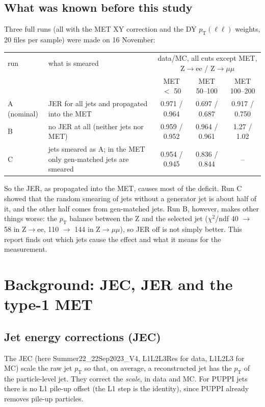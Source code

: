 \documentclass[11pt,a4paper]{article}
\newcommand{\Zee}{Z$\to$ee}
\newcommand{\Zmm}{Z$\to\mu\mu$}
\newcommand{\pt}{$p_\mathrm{T}$}
\begin{document}
\subsection{What was known before this study}
Three full runs (all with the MET XY correction and the DY $p_\mathrm{T}(\ell\ell)$ weights, 20 files per sample) were made on 16 November:
\begin{center}
\footnotesize
\begin{tabular}{l p{5.4cm} ccc}
\toprule
run & what is smeared & \multicolumn{3}{c}{data/MC, all cuts except MET, \Zee{} / \Zmm} \\
 & & MET $<$ 50 & MET 50--100 & MET 100--200 \\
\midrule
A (nominal) & JER for all jets and propagated into the MET & 0.971 / 0.964 & 0.697 / 0.687 & 0.917 / 0.750 \\
B & no JER at all (neither jets nor MET) & 0.959 / 0.952 & 0.964 / 0.961 & 1.27 / 1.02 \\
C & jets smeared as A; in the MET only gen-matched jets are smeared & 0.954 / 0.945 & 0.836 / 0.844 & -- \\
\bottomrule
\end{tabular}
\end{center}
So the JER, as propagated into the MET, causes most of the deficit. Run C showed that the random smearing of jets without a
generator jet is about half of it, and the other half comes from gen-matched jets. Run B, however, makes other things worse:
the \pt{} balance between the Z and the selected jet ($\chi^2$/ndf 40 $\to$ 58 in \Zee, 110 $\to$ 144 in \Zmm), so JER off is
not simply better. This report finds out which jets cause the effect and what it means for the measurement.

\section{Background: JEC, JER and the type-1 MET}
\label{sec:bg}

\subsection{Jet energy corrections (JEC)}
The JEC (here Summer22\_22Sep2023\_V4, L1L2L3Res for data, L1L2L3 for MC) scale the raw jet \pt{} so that, on average,
a reconstructed jet has the \pt{} of the particle-level jet. They correct the \emph{scale}, in data and MC.
For PUPPI jets there is no L1 pile-up offset (the L1 step is the identity), since PUPPI already removes pile-up particles.
\end{document}
